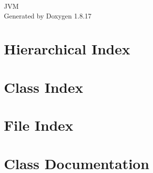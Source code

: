 \let\mypdfximage\pdfximage\def\pdfximage{\immediate\mypdfximage}\documentclass[twoside]{book}
\newcommand{\+}{\discretionary{\mbox{\scriptsize$\hookleftarrow$}}{}{}}
\newcommand{\clearemptydoublepage}{%
  \newpage{\pagestyle{empty}\cleardoublepage}%
}
\begin{document}
\hypersetup{pageanchor=false,
             bookmarksnumbered=true,
             pdfencoding=unicode
            }
\begin{titlepage}
\vspace*{7cm}
\begin{center}%
{\Large J\+VM }\\
\vspace*{1cm}
{\large Generated by Doxygen 1.8.17}\\
\end{center}
\end{titlepage}
\clearemptydoublepage
{}
\tableofcontents
\clearemptydoublepage
{}
\hypersetup{pageanchor=true}

\chapter{Hierarchical Index}

\chapter{Class Index}

\chapter{File Index}

\chapter{Class Documentation}























































\end{document}
